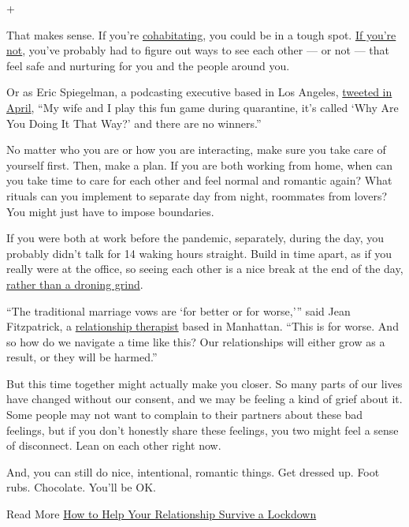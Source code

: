 +

That makes sense. If you're
\href{https://www.nytimes3xbfgragh.onion/2020/05/26/style/coronavirus-living-together-callout.html}{cohabitating},
you could be in a tough spot.
\href{https://www.nytimes3xbfgragh.onion/2020/04/30/smarter-living/coronavirus-long-distance-relationships.html}{If
you're not}, you've probably had to figure out ways to see each other
--- or not --- that feel safe and nurturing for you and the people
around you.

Or as Eric Spiegelman, a podcasting executive based in Los Angeles,
\href{https://twitter.com/ericspiegelman/status/1246488909221003264?lang=en}{tweeted
in April}, ``My wife and I play this fun game during quarantine, it's
called `Why Are You Doing It That Way?' and there are no winners.''

No matter who you are or how you are interacting, make sure you take
care of yourself first. Then, make a plan. If you are both working from
home, when can you take time to care for each other and feel normal and
romantic again? What rituals can you implement to separate day from
night, roommates from lovers? You might just have to impose boundaries.

If you were both at work before the pandemic, separately, during the
day, you probably didn't talk for 14 waking hours straight. Build in
time apart, as if you really were at the office, so seeing each other is
a nice break at the end of the day,
\href{https://www.nytimes3xbfgragh.onion/2020/07/08/parenting/coronavirus-marriage-relationships.html}{rather
than a droning grind}.

``The traditional marriage vows are `for better or for worse,''' said
Jean Fitzpatrick, a \href{https://therapistnyc.com/}{relationship
therapist} based in Manhattan. ``This is for worse. And so how do we
navigate a time like this? Our relationships will either grow as a
result, or they will be harmed.''

But this time together might actually make you closer. So many parts of
our lives have changed without our consent, and we may be feeling a kind
of grief about it. Some people may not want to complain to their
partners about these bad feelings, but if you don't honestly share these
feelings, you two might feel a sense of disconnect. Lean on each other
right now.

And, you can still do nice, intentional, romantic things. Get dressed
up. Foot rubs. Chocolate. You'll be OK.

 Read More
\href{https://www.nytimes3xbfgragh.onion/2020/04/03/smarter-living/coronavirus-relationship-advice.html}{How
to Help Your Relationship Survive a Lockdown}

